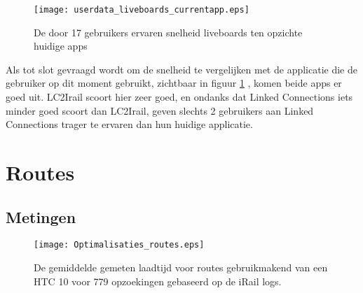 \begin{figure}[ht]
	\centering
	\texttt{[image: userdata\_liveboards\_currentapp.eps]}
	\caption[Door gebruikers ervaren snelheid liveboards tov huidige apps]{De door 17 gebruikers ervaren snelheid liveboards ten opzichte huidige apps }
	\label{fig:relativePerceptionLiveboards}
\end{figure}

Als tot slot gevraagd wordt om de snelheid te vergelijken met de applicatie die de gebruiker op dit moment gebruikt, zichtbaar in figuur \ref{fig:relativePerceptionLiveboards} , komen beide apps er goed uit. LC2Irail scoort hier zeer goed, en ondanks dat Linked Connections iets minder goed scoort dan LC2Irail, geven slechts 2 gebruikers aan Linked Connections trager te ervaren dan hun huidige applicatie.

\section{Routes}

\subsection{Metingen}
\begin{figure}[h]
	\centering
	\texttt{[image: Optimalisaties\_routes.eps]}
	\caption[Gemeten laadtijd routes]{De gemiddelde gemeten laadtijd voor routes gebruikmakend van een HTC 10 voor 779 opzoekingen gebaseerd op de iRail logs.}
	\label{fig:routelabtest}
\end{figure}
%		

